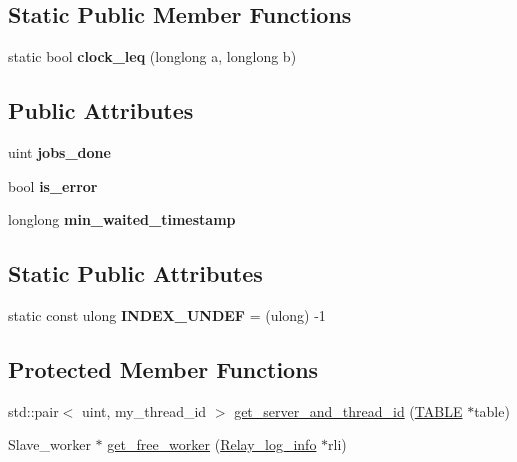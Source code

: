 \subsection*{Static Public Member Functions}
\begin{DoxyCompactItemize}
\item 
\mbox{\label{classMts__submode__logical__clock_a864989cdf17ff4a696b4f74dd8a00c1d}} 
static bool {\bfseries clock\+\_\+leq} (longlong a, longlong b)
\end{DoxyCompactItemize}
\subsection*{Public Attributes}
\begin{DoxyCompactItemize}
\item 
\mbox{\label{classMts__submode__logical__clock_a691eb2ea538782d6dada60468d28cb0a}} 
uint {\bfseries jobs\+\_\+done}
\item 
\mbox{\label{classMts__submode__logical__clock_a62f1fd1935a78bbd7dac021de2354ea7}} 
bool {\bfseries is\+\_\+error}
\item 
\mbox{\label{classMts__submode__logical__clock_a4959abc53705fc3a371747de15f254a3}} 
longlong {\bfseries min\+\_\+waited\+\_\+timestamp}
\end{DoxyCompactItemize}
\subsection*{Static Public Attributes}
\begin{DoxyCompactItemize}
\item 
\mbox{\label{classMts__submode__logical__clock_a744169bad4e3ea03a15e62ba4e24492b}} 
static const ulong {\bfseries I\+N\+D\+E\+X\+\_\+\+U\+N\+D\+EF} = (ulong) -\/1
\end{DoxyCompactItemize}
\subsection*{Protected Member Functions}
\begin{DoxyCompactItemize}
\item 
std\+::pair$<$ uint, my\+\_\+thread\+\_\+id $>$ \mbox{\hyperlink{classMts__submode__logical__clock_ac75e4dcd258a79d3c4eb03ab0bf0ad02}{get\+\_\+server\+\_\+and\+\_\+thread\+\_\+id}} (\mbox{\hyperlink{structTABLE}{T\+A\+B\+LE}} $\ast$table)
\item 
Slave\+\_\+worker $\ast$ \mbox{\hyperlink{classMts__submode__logical__clock_a093957d2566da47579792a82f499e147}{get\+\_\+free\+\_\+worker}} (\mbox{\hyperlink{classRelay__log__info}{Relay\+\_\+log\+\_\+info}} $\ast$rli)
\end{DoxyCompactItemize}
